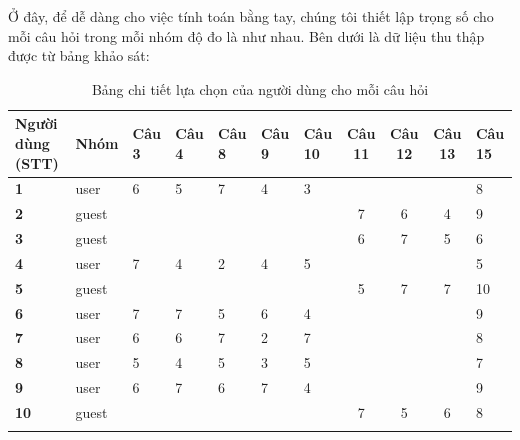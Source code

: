 Ở đây, để dễ dàng cho việc tính toán bằng tay, chúng tôi thiết lập trọng số cho mỗi câu hỏi trong mỗi nhóm độ đo là như nhau. Bên dưới là dữ liệu thu thập được từ bảng khảo sát:
\begin{center}
\begin{table}[H]
    \begin{tabular}{|p{1cm}|p{1cm}|p{1cm}|p{1cm}|p{1cm}|p{1cm}|p{1cm}|p{1cm}|p{1cm}|p{1cm}|p{1cm}|}
        \hline
        \textbf{Người dùng (STT)} & \textbf{Nhóm} & \textbf{Câu 3} & \textbf{Câu 4} & \textbf{Câu 8} & \textbf{Câu 9} & \textbf{Câu 10} & \multicolumn{1}{c|}{\textbf{Câu 11}} & \multicolumn{1}{c|}{\textbf{Câu 12}} & \multicolumn{1}{c|}{\textbf{Câu 13}} & \textbf{Câu 15} \\ \hline
        \textbf{1} & user & 6 & 5 & 7 & 4 & 3 &  &  &  & 8 \\ \hline
        \textbf{2} & guest & \multicolumn{1}{l|}{} & \multicolumn{1}{l|}{} & \multicolumn{1}{l|}{} & \multicolumn{1}{l|}{} & \multicolumn{1}{l|}{} & \multicolumn{1}{c|}{7} & \multicolumn{1}{c|}{6} & \multicolumn{1}{c|}{4} & 9 \\ \hline
        \textbf{3} & guest & \multicolumn{1}{l|}{} & \multicolumn{1}{l|}{} & \multicolumn{1}{l|}{} & \multicolumn{1}{l|}{} & \multicolumn{1}{l|}{} & \multicolumn{1}{c|}{6} & \multicolumn{1}{c|}{7} & \multicolumn{1}{c|}{5} & 6 \\ \hline
        \textbf{4} & user & 7 & 4 & 2 & 4 & 5 &  &  &  & 5 \\ \hline
        \textbf{5} & guest & \multicolumn{1}{l|}{} & \multicolumn{1}{l|}{} & \multicolumn{1}{l|}{} & \multicolumn{1}{l|}{} & \multicolumn{1}{l|}{} & \multicolumn{1}{c|}{5} & \multicolumn{1}{c|}{7} & \multicolumn{1}{c|}{7} & 10 \\ \hline
        \textbf{6} & user & 7 & 7 & 5 & 6 & 4 &  &  &  & 9 \\ \hline
        \textbf{7} & user & 6 & 6 & 7 & 2 & 7 &  &  &  & 8 \\ \hline
        \textbf{8} & user & 5 & 4 & 5 & 3 & 5 &  &  &  & 7 \\ \hline
        \textbf{9} & user & 6 & 7 & 6 & 7 & 4 &  &  &  & 9 \\ \hline
        \textbf{10} & guest & \multicolumn{1}{l|}{} & \multicolumn{1}{l|}{} & \multicolumn{1}{l|}{} & \multicolumn{1}{l|}{} & \multicolumn{1}{l|}{} & \multicolumn{1}{c|}{7} & \multicolumn{1}{c|}{5} & \multicolumn{1}{c|}{6} & 8 \\ \hline
        \vspace{0.5cm}
        \end{tabular}
        \caption{Bảng chi tiết lựa chọn của người dùng cho mỗi câu hỏi}
    \end{table}
\end{center}
